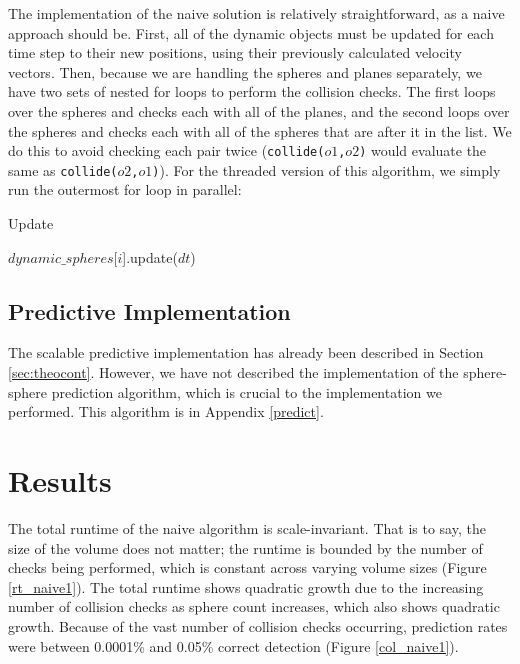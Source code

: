 \documentclass[CEJCS,PDF]{cej} %
\begin{document}
The implementation of the naive solution is relatively straightforward, as a naive approach should be.  First, all of the dynamic objects must be updated for each time step to their new positions, using their previously calculated velocity vectors.  Then, because we are handling the spheres and planes separately, we have two sets of nested for loops to perform the collision checks.  The first loops over the spheres and checks each with all of the planes, and the second loops over the spheres and checks each with all of the spheres that are after it in the list.  We do this to avoid checking each pair twice (\texttt{collide($o1$,$o2$)} would evaluate the same as \texttt{collide($o2$,$o1$)}). For the threaded version of this algorithm, we simply run the outermost for loop in parallel:

\begin{algorithm}
\caption{Update}
\begin{algorithmic}
	\STATE $dynamic\_spheres$[$i$].update($dt$)
\ENDFOR
\end{algorithmic}
\end{algorithm}

\subsection{Predictive Implementation}

The scalable predictive implementation has already been described in Section \ref{sec:theocont}.  However, we have not described the implementation of the sphere-sphere prediction algorithm, which is crucial to the 
implementation we performed.  This algorithm is in Appendix \ref{predict}.

\section{Results} 
\label{results}
The total runtime of the naive algorithm is scale-invariant.  That is to say, the size of the volume does not matter; the runtime is bounded by the number of checks being performed, which is constant across varying volume sizes (Figure \ref{rt_naive1}).  The total runtime shows quadratic growth due to the increasing number of collision checks as sphere count increases, which also shows quadratic growth.  Because of the vast number of collision checks occurring, prediction rates were between 0.0001\% and 0.05\% correct detection (Figure \ref{col_naive1}).
\end{document}
